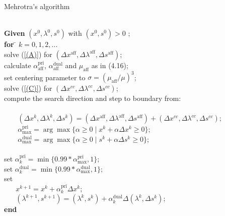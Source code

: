 \documentclass[a4paper,10 pt,titlepage,twoside]{book}
\theoremstyle{plain}
\theoremstyle{definition}
\theoremstyle{remark}
\begin{document}
\begin{algorithm}[H]\caption{Mehrotra's algorithm}
\begin{tabbing}
	\\
	\textbf{Given} $(x^{0}, \lambda^{0}, s^{0})$ with $(x^{0}, s^{0})> 0$ ; \\
	\textbf{for} \= $k = 0, 1, 2,...$ \\
	\> solve (\ref{(A)}) for $(\Delta x^{\text{aff}},\Delta \lambda^{\text{aff}},\Delta s^{\text{aff}})$;\\
	\> calculate $\alpha_{\text{aff}}^{\text{pri}}$, $\alpha_{\text{aff}}^{\text{dual}}$ and $\mu_{\text{aff}}$ as in (4.16);\\
	\> set centering parameter to $\sigma = (\mu_{\text{aff}}/\mu)^{3}$; \\
	\> solve (\ref{(C)}) for $(\Delta x^{cc},\Delta \lambda^{cc},\Delta s^{cc})$;\\
	\> compute the search direction and step to boundary from: \\
	\> \\
	\> $\;\;\;\;\;\;\;(\Delta x^{k},\Delta \lambda^{k},\Delta s^{k})=(\Delta x^{\text{aff}},\Delta \lambda^{\text{aff}},\Delta s^{\text{aff}})+(\Delta x^{cc},\Delta  \lambda^{cc},\Delta s^{cc})$;\\
	\> $\;\;\;\;\;\;\;\alpha_{\text{max}}^{\text{pri}}=\arg\max\{\alpha\geq0\;|\;x^{k} +\alpha\Delta x^{k}\geq 0\}$;\\
	\> $\;\;\;\;\;\;\;\alpha_{\text{max}}^{\text{dual}}=\arg\max\{\alpha\geq0\;|\;s^{k} +\alpha\Delta s^{k}\geq 0\}$;\\
	\>\\
	\> set $\alpha_{k}^{\text{pri}}=\min\{0.99\ast\alpha_{\text{max}}^{\text{pri}},1\}$;\\
	\> set $\alpha_{k}^{\text{dual}}=\min\{0.99\ast\alpha_{\text{max}}^{\text{dual}},1\}$;\\
	\> set\\
	\> $\;\;\;\;\;\;x^{k+1} = x^{k} + \alpha_{k}^{\text{pri}}\Delta x^{k}$;\\
	\>$\;\;\;\;\;\;(\lambda^{k+1},s^{k+1}) = (\lambda^{k},s^{k}) + \alpha_{k}^{\text{dual}}\Delta (\lambda^{k},\Delta s^{k})$;\\
\textbf{end}
\end{tabbing}
\end{algorithm}
\end{document}
